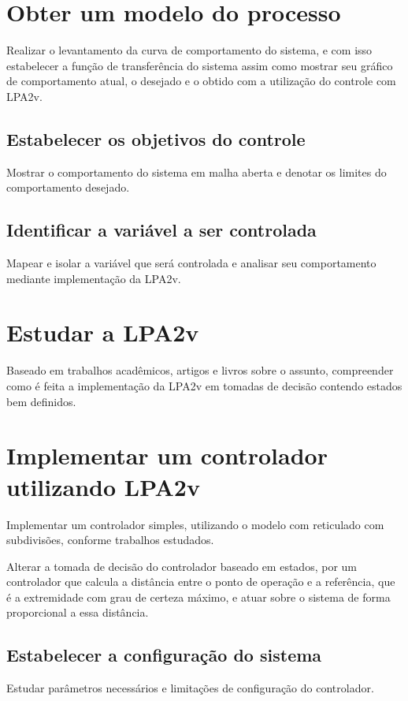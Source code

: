\section{ Obter um modelo do processo }
Realizar o levantamento da curva de comportamento do sistema, e com isso estabelecer a função de transferência do sistema assim como mostrar seu gráfico de comportamento atual, o desejado e o obtido com a utilização do controle com LPA2v.

\subsection{ Estabelecer os objetivos do controle }
Mostrar o comportamento do sistema em malha aberta e denotar os limites do comportamento desejado.

\subsection{ Identificar a variável a ser controlada }

Mapear e isolar a variável que será controlada e analisar seu comportamento mediante implementação da LPA2v.

\section{ Estudar a LPA2v }

Baseado em trabalhos acadêmicos, artigos e livros sobre o assunto, compreender como é feita a implementação da LPA2v em tomadas de decisão contendo estados bem definidos.

\section{ Implementar um controlador utilizando LPA2v}

Implementar um controlador simples, utilizando o modelo com reticulado com subdivisões, conforme trabalhos estudados. 

Alterar a tomada de decisão do  controlador baseado em estados, por um controlador que calcula a distância entre o ponto de operação e a referência, que é a extremidade com grau de certeza máximo, e atuar sobre o sistema de forma proporcional a essa distância.


\subsection{ Estabelecer a configuração do sistema }
Estudar parâmetros necessários e limitações de configuração do controlador.

